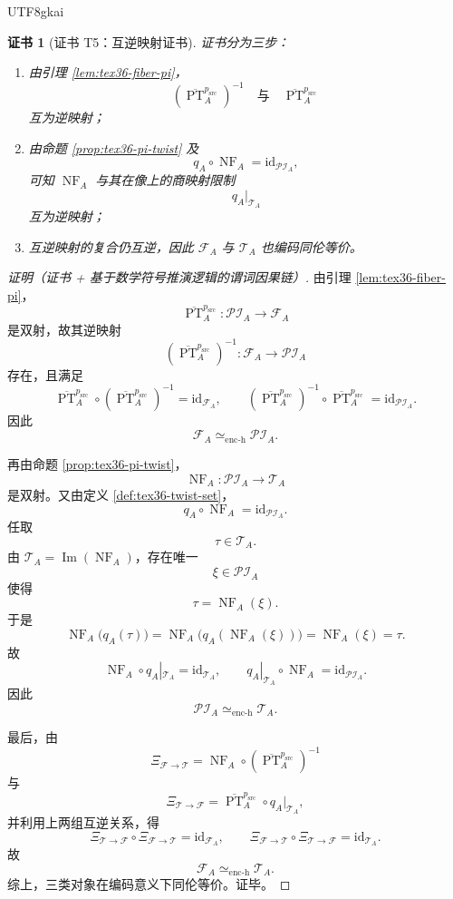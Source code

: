 \documentclass[12pt]{article}
\newtheorem{Certificate}{证书}[section]
\newcommand{\PT}{\operatorname{PT}}
\newcommand{\Img}{\operatorname{Im}}
\newcommand{\NF}{\operatorname{NF}}
\newcommand{\id}{\mathrm{id}}
\begin{document}
\begin{CJK*}{UTF8}{gkai}
\begin{Certificate}[证书 T5：互逆映射证书]
\label{cert:tex36-t5}
证书分为三步：
\begin{enumerate}
  \item 由引理 \ref{lem:tex36-fiber-pi}，
  \[
    (\overline{\PT}_A^{p_{\mathrm{src}}})^{-1}
    \quad\text{与}\quad
    \overline{\PT}_A^{p_{\mathrm{src}}}
  \]
  互为逆映射；
  \item 由命题 \ref{prop:tex36-pi-twist} 及
  \[
    q_A\circ \NF_A=\id_{\mathcal{PI}_A},
  \]
  可知 $\NF_A$ 与其在像上的商映射限制
  \[
    q_A|_{\mathcal T_A}
  \]
  互为逆映射；
  \item 互逆映射的复合仍互逆，因此 $\mathcal F_A$ 与 $\mathcal T_A$ 也编码同伦等价。
\end{enumerate}
\end{Certificate}

\begin{proof}[证明（证书 + 基于数学符号推演逻辑的谓词因果链）]
由引理 \ref{lem:tex36-fiber-pi}，
\[
  \overline{\PT}_A^{p_{\mathrm{src}}}:
  \mathcal{PI}_A\to \mathcal F_A
\]
是双射，故其逆映射
\[
  (\overline{\PT}_A^{p_{\mathrm{src}}})^{-1}:
  \mathcal F_A\to \mathcal{PI}_A
\]
存在，且满足
\[
  \overline{\PT}_A^{p_{\mathrm{src}}}
  \circ
  (\overline{\PT}_A^{p_{\mathrm{src}}})^{-1}
  =\id_{\mathcal F_A},
  \qquad
  (\overline{\PT}_A^{p_{\mathrm{src}}})^{-1}
  \circ
  \overline{\PT}_A^{p_{\mathrm{src}}}
  =\id_{\mathcal{PI}_A}.
\]
因此
\[
  \mathcal F_A\simeq_{\mathrm{enc\text{-}h}}\mathcal{PI}_A.
\]

再由命题 \ref{prop:tex36-pi-twist}，
\[
  \NF_A:\mathcal{PI}_A\to \mathcal T_A
\]
是双射。又由定义 \ref{def:tex36-twist-set}，
\[
  q_A\circ \NF_A=\id_{\mathcal{PI}_A}.
\]
任取
\[
  \tau\in \mathcal T_A.
\]
由 $\mathcal T_A=\Img(\NF_A)$，存在唯一
\[
  \xi\in \mathcal{PI}_A
\]
使得
\[
  \tau=\NF_A(\xi).
\]
于是
\[
  \NF_A\bigl(q_A(\tau)\bigr)
  =
  \NF_A\bigl(q_A(\NF_A(\xi))\bigr)
  =
  \NF_A(\xi)
  =
  \tau.
\]
故
\[
  \NF_A\circ q_A|_{\mathcal T_A}=\id_{\mathcal T_A},
  \qquad
  q_A|_{\mathcal T_A}\circ \NF_A=\id_{\mathcal{PI}_A}.
\]
因此
\[
  \mathcal{PI}_A\simeq_{\mathrm{enc\text{-}h}}\mathcal T_A.
\]

最后，由
\[
  \Xi_{\mathcal F\to \mathcal T}
  =
  \NF_A\circ (\overline{\PT}_A^{p_{\mathrm{src}}})^{-1}
\]
与
\[
  \Xi_{\mathcal T\to \mathcal F}
  =
  \overline{\PT}_A^{p_{\mathrm{src}}}\circ q_A|_{\mathcal T_A},
\]
并利用上两组互逆关系，得
\[
  \Xi_{\mathcal T\to \mathcal F}\circ \Xi_{\mathcal F\to \mathcal T}
  =\id_{\mathcal F_A},
  \qquad
  \Xi_{\mathcal F\to \mathcal T}\circ \Xi_{\mathcal T\to \mathcal F}
  =\id_{\mathcal T_A}.
\]
故
\[
  \mathcal F_A\simeq_{\mathrm{enc\text{-}h}}\mathcal T_A.
\]
综上，三类对象在编码意义下同伦等价。证毕。
\end{proof}


\end{CJK*}
\end{document}
